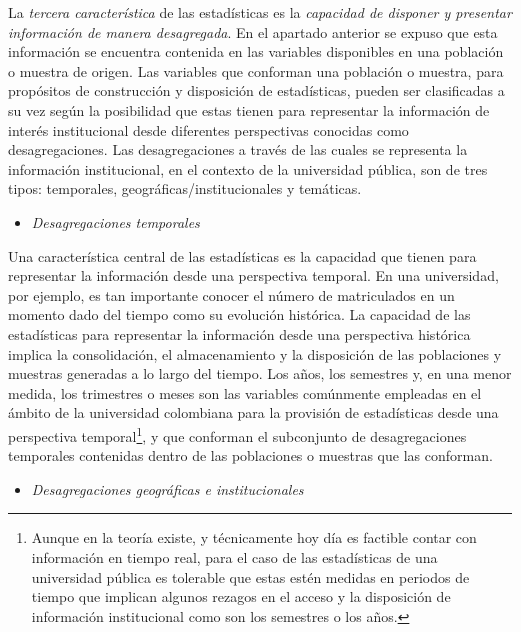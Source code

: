 \documentclass[
]{book}
\providecommand{\tightlist}{%
  \setlength{\itemsep}{0pt}\setlength{\parskip}{0pt}}
\begin{document}
La \emph{tercera característica} de las estadísticas es la \emph{capacidad de disponer y presentar información de manera desagregada}. En el apartado anterior se expuso que esta información se encuentra contenida en las variables disponibles en una población o muestra de origen. Las variables que conforman una población o muestra, para propósitos de construcción y disposición de estadísticas, pueden ser clasificadas a su vez según la posibilidad que estas tienen para representar la información de interés institucional desde diferentes perspectivas conocidas como desagregaciones. Las desagregaciones a través de las cuales se representa la información institucional, en el contexto de la universidad pública, son de tres tipos: temporales, geográficas/institucionales y temáticas.

\begin{itemize}
\tightlist
\item
  \emph{Desagregaciones temporales}
\end{itemize}

Una característica central de las estadísticas es la capacidad que tienen para representar la información desde una perspectiva temporal. En una universidad, por ejemplo, es tan importante conocer el número de matriculados en un momento dado del tiempo como su evolución histórica. La capacidad de las estadísticas para representar la información desde una perspectiva histórica implica la consolidación, el almacenamiento y la disposición de las poblaciones y muestras generadas a lo largo del tiempo. Los años, los semestres y, en una menor medida, los trimestres o meses son las variables comúnmente empleadas en el ámbito de la universidad colombiana para la provisión de estadísticas desde una perspectiva temporal\footnote{Aunque en la teoría existe, y técnicamente hoy día es factible contar con información en tiempo real, para el caso de las estadísticas de una universidad pública es tolerable que estas estén medidas en periodos de tiempo que implican algunos rezagos en el acceso y la disposición de información institucional como son los semestres o los años.}, y que conforman el subconjunto de desagregaciones temporales contenidas dentro de las poblaciones o muestras que las conforman.

\begin{itemize}
\tightlist
\item
  \emph{Desagregaciones geográficas e institucionales}
\end{itemize}
\end{document}
